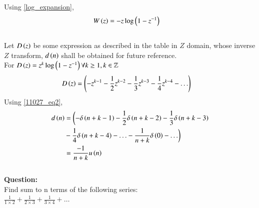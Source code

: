 \documentclass[journal,12pt,twocolumn]{IEEEtran}
\theoremstyle{remark}
\begin{document}
Using \eqref{log_expansion},
\begin{align}
	W\left(z\right)&= -z\log\left(1-z^{-1}\right) \label{When_c_equals_1}	
\end{align}
\\
Let $D\left(z\right)$ be some expression as described in the table in $Z$ domain, whose inverse $Z$ transform, $d\left(n\right)$ shall be obtained for future reference.\\
For $D\left(z\right)= z^{k}\log\left(1-z^{-1}\right) \forall k \geq 1, k\in \mathbb{Z}$
\begin{align}
	D\left(z\right)&= \left(-z^{k-1} - \frac{1}{2}z^{k-2} - \frac{1}{3}z^{k-3} - \frac{1}{4}z^{k-4} - \ldots\right)
\end{align}
Using \eqref{11027_eq2},
\begin{align}
	d\left(n\right) &= \biggl(-\delta\left(n+k-1\right)  -\frac{1}{2}\delta\left(n+k-2\right)  -\frac{1}{3}\delta\left(n+k-3\right) \notag \\ &-\frac{1}{4}\delta\left(n+k-4\right) - \ldots - \frac{1}{n+k}\delta\left(0\right)-\ldots\biggr)\\
	&= \frac{-1}{n+k} u\left(n\right) \label{11027_eq_log}
\end{align}
\\
\newpage
\textbf{Question:} \\
Find sum to n terms of the following series:\\
$\frac{1}{1 \times 2} + \frac{1}{2 \times 3} + \frac{1}{3 \times 4} + \ldots$
\bigskip \bigskip
\end{document}
